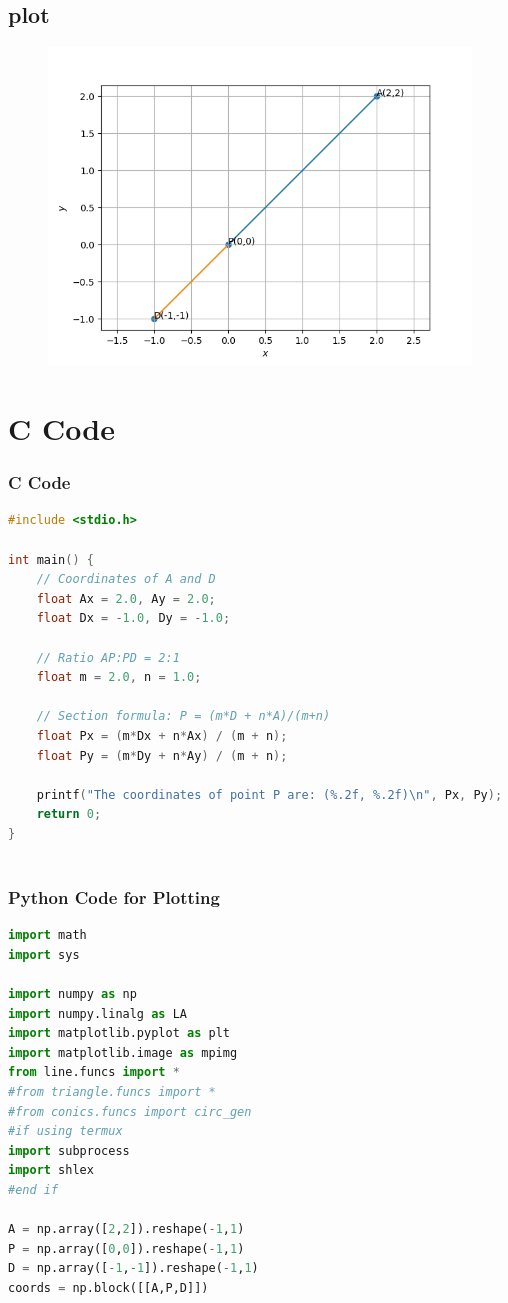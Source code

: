 \documentclass{beamer}
\theoremstyle{remark}
\numberwithin{equation}{section}
\begin{document}
    \subsection{plot}
       \begin{frame}[fragile]
    \begin{figure}[H]
    \centering
    \includegraphics[width = 0.6\columnwidth]{../figs/img.png}
    \caption*{}
    \label{figs}
\end{figure}
\end{frame}
\section{ C Code}
\begin{frame}[fragile]
\frametitle{C Code }
\begin{lstlisting}[language=C]
#include <stdio.h>

int main() {
    // Coordinates of A and D
    float Ax = 2.0, Ay = 2.0;
    float Dx = -1.0, Dy = -1.0;

    // Ratio AP:PD = 2:1
    float m = 2.0, n = 1.0;

    // Section formula: P = (m*D + n*A)/(m+n)
    float Px = (m*Dx + n*Ax) / (m + n);
    float Py = (m*Dy + n*Ay) / (m + n);

    printf("The coordinates of point P are: (%.2f, %.2f)\n", Px, Py);
    return 0;
}
    
\end{lstlisting}
\end{frame}



\begin{frame}[fragile]
\frametitle{Python Code for Plotting}
\begin{lstlisting}[language=Python]
import math
import sys   

import numpy as np
import numpy.linalg as LA
import matplotlib.pyplot as plt
import matplotlib.image as mpimg
from line.funcs import *
#from triangle.funcs import *
#from conics.funcs import circ_gen
#if using termux
import subprocess
import shlex
#end if

A = np.array([2,2]).reshape(-1,1)
P = np.array([0,0]).reshape(-1,1)
D = np.array([-1,-1]).reshape(-1,1)
coords = np.block([[A,P,D]])

\end{lstlisting}

\end{frame}
\end{document}
